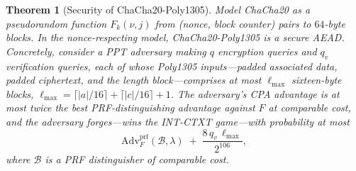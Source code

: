 \documentclass[11pt,a4paper]{article}
\newtheorem{theorem}{Theorem}[section]
\theoremstyle{definition}
\theoremstyle{remark}
\providecommand{\ceil}[1]{\lceil #1 \rceil}
\begin{document}
\begin{theorem}[Security of ChaCha20-Poly1305]
\label{symmetric:thm-chachapoly}
Model \textsf{ChaCha20} as a pseudorandom function \(F_{k}(\nu, j)\)
from (nonce, block counter) pairs to \(64\)-byte blocks. In the
nonce-respecting model, \textsf{ChaCha20-Poly1305} is a secure AEAD.
Concretely, consider a PPT adversary making \(q\) encryption queries
and \(q_{v}\) verification queries, each of whose \textsf{Poly1305}
inputs---padded associated data, padded ciphertext, and the length
block---comprises at most \(\ell_{\max}\) sixteen-byte blocks,
\(\ell_{\max} = \ceil{|a|/16} + \ceil{|c|/16} + 1\). The adversary's CPA
advantage is at most twice the best PRF-distinguishing advantage
against \(F\) at comparable cost, and the adversary forges---wins the
INT-CTXT game---with probability at most
\[
\mathrm{Adv}^{\mathrm{prf}}_{F}(\mathcal{B}, \lambda)
\;+\; \frac{8\, q_{v}\, \ell_{\max}}{2^{106}},
\]
where \(\mathcal{B}\) is a PRF distinguisher of comparable cost.
\end{theorem}
\end{document}
